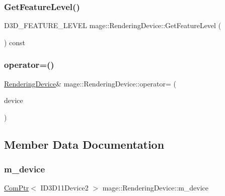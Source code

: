 \hypertarget{classmage_1_1_rendering_device_a1bdcb0b7047cf01160953e99083b3185}{}\label{classmage_1_1_rendering_device_a1bdcb0b7047cf01160953e99083b3185} 
\subsubsection{\texorpdfstring{Get\+Feature\+Level()}{GetFeatureLevel()}}
{\footnotesize\ttfamily D3\+D\+\_\+\+F\+E\+A\+T\+U\+R\+E\+\_\+\+L\+E\+V\+EL mage\+::\+Rendering\+Device\+::\+Get\+Feature\+Level (\begin{DoxyParamCaption}{ }\end{DoxyParamCaption}) const}

\hypertarget{classmage_1_1_rendering_device_a5d2a76086e876f5932e715f4bcdef726}{}\label{classmage_1_1_rendering_device_a5d2a76086e876f5932e715f4bcdef726} 
\subsubsection{\texorpdfstring{operator=()}{operator=()}}
{\footnotesize\ttfamily \hyperlink{classmage_1_1_rendering_device}{Rendering\+Device}\& mage\+::\+Rendering\+Device\+::operator= (\begin{DoxyParamCaption}\item[{const \hyperlink{classmage_1_1_rendering_device}{Rendering\+Device} \&}]{device }\end{DoxyParamCaption})\hspace{0.3cm}{\ttfamily [default]}}



\subsection{Member Data Documentation}
\hypertarget{classmage_1_1_rendering_device_a157a9361117c6ac021b044bcb9f7c1e6}{}\label{classmage_1_1_rendering_device_a157a9361117c6ac021b044bcb9f7c1e6} 
\subsubsection{\texorpdfstring{m\+\_\+device}{m\_device}}
{\footnotesize\ttfamily \hyperlink{namespacemage_ae74f374780900893caa5555d1031fd79}{Com\+Ptr}$<$ I\+D3\+D11\+Device2 $>$ mage\+::\+Rendering\+Device\+::m\+\_\+device\hspace{0.3cm}{\ttfamily [private]}}

